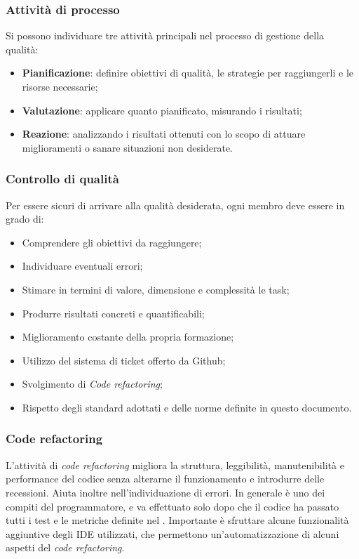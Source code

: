 \subsubsection{Attività di processo}
Si possono individuare tre attività principali nel processo di gestione della qualità:
\begin{itemize}
\item \textbf{Pianificazione}: definire obiettivi di qualità, le strategie per raggiungerli e le risorse necessarie; 
\item \textbf{Valutazione}: applicare quanto pianificato, misurando i risultati;
\item \textbf{Reazione}: analizzando i risultati ottenuti con lo scopo di attuare miglioramenti o sanare situazioni non desiderate.
\end{itemize}

\subsubsection{Controllo di qualità}
Per essere sicuri di arrivare alla qualità desiderata, ogni membro deve essere in grado di:
\begin{itemize}
\item Comprendere gli obiettivi da raggiungere;
\item Individuare eventuali errori;
\item Stimare in termini di valore, dimensione e complessità le task;
\item Produrre risultati concreti e quantificabili;
\item Miglioramento costante della propria formazione;
\item Utilizzo del sistema di ticket offerto da Github;
\item Svolgimento di \textit{Code refactoring};
\item Rispetto degli standard adottati e delle norme definite in questo documento.
\end{itemize}

\subsubsection{Code refactoring}
L'attività di \textit{code refactoring} migliora la struttura, leggibilità, manutenibilità e performance del codice senza alterarne il funzionamento e introdurre delle recessioni. Aiuta inoltre nell'individuazione di errori.
In generale è uno dei compiti del programmatore, e va effettuato solo dopo che il codice ha passato tutti i test e le metriche definite nel \PdQ. 
Importante è sfruttare alcune funzionalità aggiuntive degli IDE utilizzati, che permettono un'automatizzazione di alcuni aspetti del \textit{code refactoring}.

